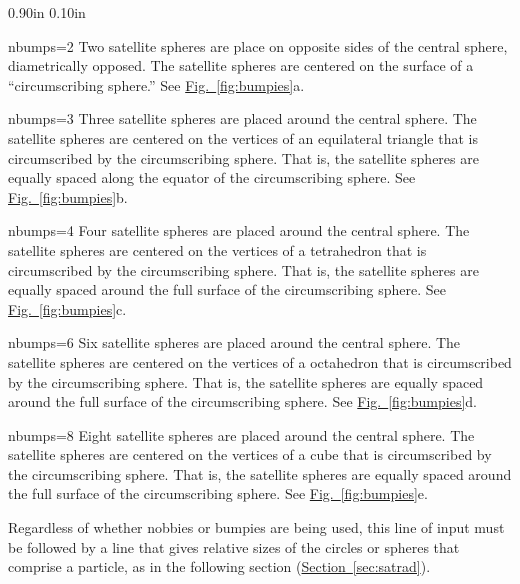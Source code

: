 \documentclass[letterpaper,11pt]{article}
\newlength{\Labelwidth}
\newcommand{\Entrylabel}[1]{\makebox[\Labelwidth][r]{\texttt{#1}}}
\newenvironment{Options}
{\begin{list}{}{%
\renewcommand{\makelabel}{\Entrylabel}%
\setlength{\leftmargin} {0.90in}%
\setlength{\rightmargin}{0.00in}%
\setlength{\labelsep}   {0.10in}%
\setlength{\labelwidth} {\Labelwidth}%
}}
{\end{list}}
\begin{document}
\begin{Options}
\item[nbumps=2]
Two satellite spheres are place on opposite sides of the central sphere,
diametrically opposed.
The satellite spheres are centered on the surface of a ``circumscribing
sphere.''  See \hyperref[fig:bumpies]{Fig.~\ref*{fig:bumpies}}a.
\item[nbumps=3]
Three satellite spheres are placed around the central sphere.
The satellite spheres are centered on the vertices of an equilateral triangle
that is circumscribed by the circumscribing sphere.
That is, the satellite spheres are equally spaced along the equator
of the circumscribing sphere.
See \hyperref[fig:bumpies]{Fig.~\ref*{fig:bumpies}}b.
\item[nbumps=4]
Four satellite spheres are placed around the central sphere.
The satellite spheres are centered on the vertices of a
tetrahedron that is circumscribed by the circumscribing sphere.
That is, the satellite spheres are equally spaced around the full surface
of the circumscribing sphere.
See \hyperref[fig:bumpies]{Fig.~\ref*{fig:bumpies}}c.
\item[nbumps=6]
Six satellite spheres are placed around the central sphere.
The satellite spheres are centered on the vertices of a
octahedron that is circumscribed by the circumscribing sphere.
That is, the satellite spheres are equally spaced around the full surface
of the circumscribing sphere.
See \hyperref[fig:bumpies]{Fig.~\ref*{fig:bumpies}}d.
\item[nbumps=8]
Eight satellite spheres are placed around the central sphere.
The satellite spheres are centered on the vertices of a
cube that is circumscribed by the circumscribing sphere.
That is, the satellite spheres are equally spaced around the full surface
of the circumscribing sphere.
See \hyperref[fig:bumpies]{Fig.~\ref*{fig:bumpies}}e.
%
\end{Options}
%
\par
Regardless of whether nobbies or bumpies are being used, 
this line of input must be followed by a line
that gives relative sizes of the circles or spheres that comprise
a particle, as in the
following section
(\hyperref[sec:satrad]{Section~\ref*{sec:satrad}}).
%
\end{document}
